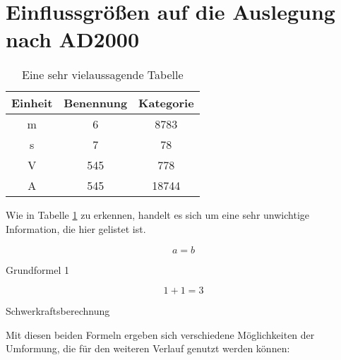 \section{Einflussgrößen auf die Auslegung nach AD2000}
\blindtext[1]



\begin{table}[htb]
\centering
\begin{tabular}{|c|cc|} 
 \hline
 Einheit & Benennung & Kategorie \\ %
 \hline
 m & 6 & 8783 \\ 
 s & 7 & 78 \\
 V & 545 & 778\\
 A & 545 & 18744\\
 \hline
\end{tabular}
\caption{Eine sehr vielaussagende Tabelle}\label{vielaussagend}
\end{table}


Wie in Tabelle \ref{vielaussagend} zu erkennen, handelt es sich um eine sehr unwichtige Information, die hier gelistet ist.\blindtext[1]


\newpage
\blindtext{}



\begin{formel}
\begin{equation}
   a=b\label{eq:Eq3}          %
\end{equation}
\caption{Grundformel 1}
\end{formel}

\begin{formel}
\begin{equation}
1+1=3\label{formel2}
\end{equation}
\caption{Schwerkraftsberechnung}
\end{formel}


Mit diesen beiden Formeln ergeben sich verschiedene Möglichkeiten der Umformung, die für den weiteren Verlauf genutzt werden können:


